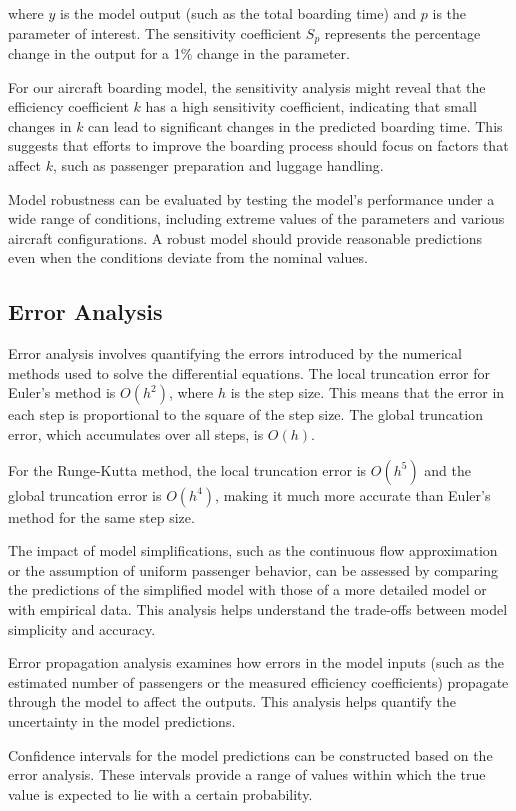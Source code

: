 \documentclass[12pt,a4paper]{article}
\begin{document}
where $y$ is the model output (such as the total boarding time) and $p$ is the parameter of interest. The sensitivity coefficient $S_p$ represents the percentage change in the output for a 1\% change in the parameter.

For our aircraft boarding model, the sensitivity analysis might reveal that the efficiency coefficient $k$ has a high sensitivity coefficient, indicating that small changes in $k$ can lead to significant changes in the predicted boarding time. This suggests that efforts to improve the boarding process should focus on factors that affect $k$, such as passenger preparation and luggage handling.

Model robustness can be evaluated by testing the model's performance under a wide range of conditions, including extreme values of the parameters and various aircraft configurations. A robust model should provide reasonable predictions even when the conditions deviate from the nominal values.

\subsection{Error Analysis}

Error analysis involves quantifying the errors introduced by the numerical methods used to solve the differential equations. The local truncation error for Euler's method is $O(h^2)$, where $h$ is the step size. This means that the error in each step is proportional to the square of the step size. The global truncation error, which accumulates over all steps, is $O(h)$.

For the Runge-Kutta method, the local truncation error is $O(h^5)$ and the global truncation error is $O(h^4)$, making it much more accurate than Euler's method for the same step size.

The impact of model simplifications, such as the continuous flow approximation or the assumption of uniform passenger behavior, can be assessed by comparing the predictions of the simplified model with those of a more detailed model or with empirical data. This analysis helps understand the trade-offs between model simplicity and accuracy.

Error propagation analysis examines how errors in the model inputs (such as the estimated number of passengers or the measured efficiency coefficients) propagate through the model to affect the outputs. This analysis helps quantify the uncertainty in the model predictions.

Confidence intervals for the model predictions can be constructed based on the error analysis. These intervals provide a range of values within which the true value is expected to lie with a certain probability.
\end{document}
